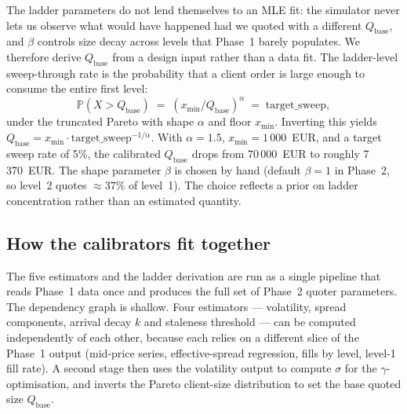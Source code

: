 The ladder parameters do not lend themselves to an MLE fit: the
simulator never lets us observe what would have happened had we
quoted with a different $Q_{\text{base}}$, and $\beta$ controls
size decay across levels that Phase~1 barely populates. We therefore
derive $Q_{\text{base}}$ from a design input rather than a data fit.
The ladder-level sweep-through rate is the probability that a client
order is large enough to consume the entire first level:
\[
\mathbb{P}(X > Q_{\text{base}})
\;=\; \left(x_{\min}/Q_{\text{base}}\right)^{\alpha}
\;=\; \text{target\_sweep},
\]
under the truncated Pareto with shape $\alpha$ and floor $x_{\min}$.
Inverting this yields
$Q_{\text{base}} = x_{\min} \cdot \text{target\_sweep}^{-1/\alpha}$.
With $\alpha = 1.5$, $x_{\min} = 1\,000$~EUR, and a target sweep
rate of 5\%, the calibrated $Q_{\text{base}}$ drops from 70\,000~EUR
to roughly 7\,370~EUR. The shape parameter $\beta$ is chosen by hand
(default $\beta = 1$ in Phase~2, so level~2 quotes $\approx 37\%$ of
level~1). The choice reflects a prior on ladder concentration rather
than an estimated quantity.

\subsection{How the calibrators fit together}

The five estimators and the ladder derivation are run as a single
pipeline that reads Phase~1 data once and produces the full set of
Phase~2 quoter parameters. The dependency graph is shallow. Four
estimators --- volatility, spread components, arrival decay $k$ and
staleness threshold --- can be computed independently of each other,
because each relies on a different slice of the Phase~1 output
(mid-price series, effective-spread regression, fills by level,
level-1 fill rate). A second stage then uses the volatility output
to compute $\sigma$ for the $\gamma$-optimisation, and inverts the
Pareto client-size distribution to set the base quoted size
$Q_{\text{base}}$.

